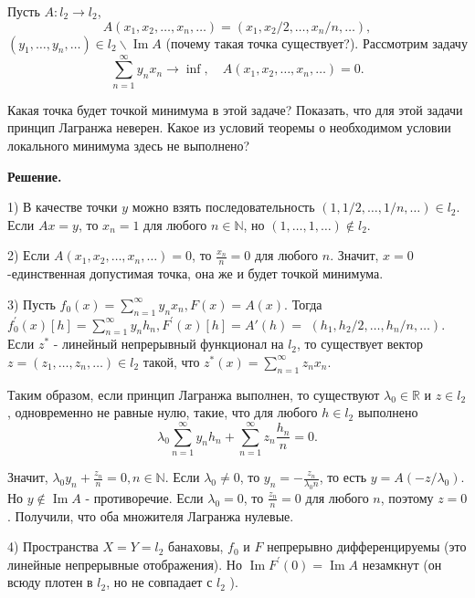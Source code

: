 \begin{task}
Пусть $A: l_2 \rightarrow l_2$,
$$
A\left(x_1, x_2, \ldots, x_n, \ldots\right)=\left(x_1, x_2 / 2, \ldots, x_n / n, \ldots\right),
$$
$\left(y_1, \ldots, y_n, \ldots\right) \in l_2 \backslash \operatorname{Im} A$ (почему такая точка существует?). Рассмотрим задачу
$$
\sum_{n=1}^{\infty} y_n x_n \rightarrow \inf , \quad A\left(x_1, x_2, \ldots, x_n, \ldots\right)=0 .
$$

Какая точка будет точкой минимума в этой задаче? Показать, что для этой задачи принцип Лагранжа неверен. Какое из условий теоремы о необходимом условии локального минимума здесь не выполнено?
\vspace{1cm}

\textbf{Решение.} 

1) В качестве точки $y$ можно взять последовательность 
$(1,1 / 2, \ldots, 1 / n, \ldots) \in l_2$. Если $A x=y$, то $x_n=1$ для любого $n \in \mathbb{N}$, но $(1, \ldots, 1, \ldots) \notin l_2$.
\vspace{0.5cm}

2) Если $A\left(x_1, x_2, \ldots, x_n, \ldots\right)=0$, то $\frac{x_n}{n}=0$ для любого $n$. Значит, $x=0$-единственная допустимая точка, она же и будет точкой минимума.
\vspace{0.5cm}

3) Пусть $f_0(x)=\sum_{n=1}^{\infty} y_n x_n, F(x)=A(x)$. Тогда $f_0^{\prime}(x)[h]=\sum_{n=1}^{\infty} y_n h_n, F^{\prime}(x)[h]=A'(h)=$ $\left(h_1, h_2 / 2, \ldots, h_n / n, \ldots\right)$. Если $z^*$ - линейный непрерывный функционал на $l_2$, то существует вектор $z=\left(z_1, \ldots, z_n, \ldots\right) \in l_2$ такой, что $z^*(x)=\sum_{n=1}^{\infty} z_n x_n$.

Таким образом, если принцип Лагранжа выполнен, то существуют $\lambda_0 \in \mathbb{R}$ и $z \in l_2$, одновременно не равные нулю, такие, что для любого $h \in l_2$ выполнено
$$
\lambda_0 \sum_{n=1}^{\infty} y_n h_n+\sum_{n=1}^{\infty} z_n \frac{h_n}{n}=0 .
$$

Значит, $\lambda_0 y_n+\frac{z_n}{n}=0, n \in \mathbb{N}$. Если $\lambda_0 \neq 0$, то $y_n=-\frac{z_n}{\lambda_0 n}$, то есть $y=A\left(-z / \lambda_0\right)$. Но $y \notin \operatorname{Im} A$ - противоречие. Если $\lambda_0=0$, то $\frac{z_n}{n}=0$ для любого $n$, поэтому $z=0$. Получили, что оба множителя Лагранжа нулевые.
\vspace{0.5cm}

4) Пространства $X=Y=l_2$ банаховы, $f_0$ и $F$ непрерывно дифференцируемы (это линейные непрерывные отображения). Но $\operatorname{Im} F^{\prime}(0)=\operatorname{Im} A$ незамкнут (он всюду плотен в $l_2$, но не совпадает с $l_2$ ).

\end{task}
